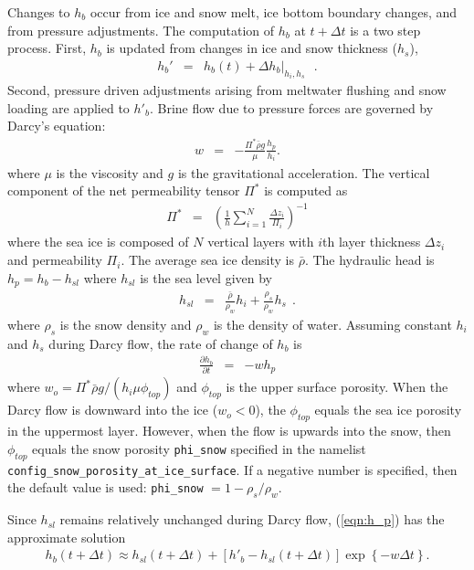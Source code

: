 Changes to $h_b$ occur from ice and snow melt, ice
bottom boundary changes,
and from  pressure adjustments. The computation of $h_b$ at $t+\Delta
t$ is a two step process. First,  $h_b$  is updated from
changes in ice and snow thickness ($h_s$), \bgcie
\begin{eqnarray}
\label{eqn:hb_thickness_changes}
h_b' & = & h_b(t) + \Delta h_b|_{h_i,h_s} \ \ \ .
\end{eqnarray}
 Second,  pressure driven adjustments arising from
meltwater flushing and snow loading are applied to $h'_b$. Brine flow due
to pressure forces are governed by
Darcy's equation:
\begin{eqnarray}
\label{eqn:Darcy}
w & = & -\frac{\Pi^* \bar{\rho} g}{\mu}\frac{h_p}{h_i}.  
\end{eqnarray}
where $\mu$ is the viscosity and $g$ is the gravitational acceleration.
The vertical component of the net permeability tensor $\Pi^*$
is computed as
\begin{eqnarray}
\label{eqn:netPi}
\Pi^* & = & \left(\frac{1}{h}\sum_{i=1}^N{\frac{\Delta
      z_i}{\Pi_i}}\right)^{-1} 
\end{eqnarray}
where the sea ice is composed of $N$ vertical layers with $i$th layer
thickness $\Delta z_i$ and
permeability $\Pi_i$. %
The average sea ice density is
$\bar{\rho}$.
 The hydraulic head is $h_p = h_b - h_{sl}$ where $h_{sl}$ is the sea
 level given by
\begin{eqnarray}
h_{sl} & = & \frac{\bar{\rho}}{\rho_w}h_i + \frac{\rho_s}{\rho_w}h_s \ \ .
\end{eqnarray}
where $\rho_s$ is the snow density and $\rho_w$ is the density of water.
Assuming constant $h_i$ and $h_s$ during Darcy flow, the rate of change of $h_b$ is
\begin{eqnarray}
\label{eqn:h_p}
\frac{\partial h_b}{\partial t}  & = & -w h_p
\end{eqnarray}
where   $w_o = \Pi^* \bar{\rho}
g/(h_i\mu\phi_{top})$ and $\phi_{top}$ is the upper surface porosity. 
When the Darcy flow is downward into the ice ($w_o < 0$), the
$\phi_{top}$ equals the sea ice porosity in the uppermost layer.  However,
when the flow is upwards into the snow, then $\phi_{top}$ equals the snow
porosity {\tt phi\_snow} specified in the namelist {\tt config\_snow\_porosity\_at\_ice\_surface}.  If a negative
number is specified, then the default value is
used: {\tt phi\_snow} $=1 - \rho_s/\rho_w$.

Since $h_{sl}$ remains relatively unchanged during Darcy flow,
(\ref{eqn:h_p}) has the approximate solution 
\begin{eqnarray}
\label{eqn:brine_height}
h_b(t+\Delta t) \approx h_{sl}(t+\Delta t) +  [h'_b - h_{sl}(t+\Delta t)]\exp\left\{-w \Delta t\right\}.
\end{eqnarray}

